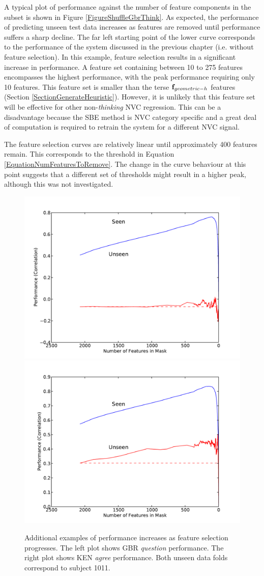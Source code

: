 A typical plot of performance against the number of feature components in the subset is shown in Figure \ref{FigureShuffleGbrThink}. As expected, the performance of predicting unseen test data increases as features are removed until performance suffers a sharp decline. The far left starting point of the lower curve corresponds to the performance of the system discussed in the previous chapter (i.e. without feature selection). In this example, feature selection results in a significant increase in performance. A feature set containing between 10 to 275 features encompasses the highest performance, with the peak performance requiring only 10 features. This feature set is smaller than the terse $\textbf{f}_{geometric-h}$ features (Section \ref{SectionGenerateHeuristic}). However, it is unlikely that this feature set will be effective for other non-\textit{thinking} \ac{NVC} regression. This can be a disadvantage because the \ac{SBE} method is \ac{NVC} category specific and a great deal of computation is required to retrain the system for a different \ac{NVC} signal.

The feature selection curves are relatively linear until approximately 400 features remain. This corresponds to the threshold in Equation \ref{EquationNumFeaturesToRemove}. The change in the curve behaviour at this point suggests that a different set of thresholds might result in a higher peak, although this was not investigated.

\begin{figure}[tb]
\centering
\includegraphics[width = 0.49 \columnwidth]{featureselection/shuffle-gbr-think/shufflefs-reverse-GBR-question-1011.pdf}
\includegraphics[width = 0.49 \columnwidth]{featureselection/shuffle-gbr-think/shufflefs-reverse-KEN-agree-1011.pdf}
\caption[Additional examples of performance increases as feature selection progresses.]{Additional examples of performance increases as feature selection progresses. The left plot shows GBR \textit{question} performance. The right plot shows KEN \textit{agree} performance. Both unseen data folds correspond to subject 1011.}
\label{FigureShuffleFeatureSelect}
\end{figure}

